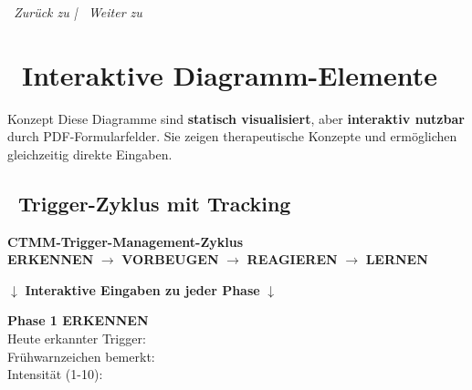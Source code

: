 \begin{center}
\textit{\textcolor{ctmmBlue}{\faChevronRight~Zurück zu}  | \textcolor{ctmmGreen}{\faChevronRight~Weiter zu} }
\end{center}

\section*{\textcolor{ctmmBlue}{\faChartBar~Interaktive Diagramm-Elemente}}
\label{sec:interactive-diagrams}

\begin{ctmmBlueBox}{Konzept}
Diese Diagramme sind \textbf{statisch visualisiert}, aber \textbf{interaktiv nutzbar} durch PDF-Formularfelder. Sie zeigen therapeutische Konzepte und ermöglichen gleichzeitig direkte Eingaben.
\end{ctmmBlueBox}

\subsection*{\faSync~Trigger-Zyklus mit Tracking}


\begin{tcolorbox}[colback=white,colframe=ctmmBlue,width=14cm]
\centering
\textbf{CTMM-Trigger-Management-Zyklus}\\[0.5cm]

\textcolor{ctmmBlue}{\Large\faEye} \textbf{ERKENNEN} 
$\rightarrow$ 
\textcolor{ctmmGreen}{\Large\faLock} \textbf{VORBEUGEN} 
$\rightarrow$ 
\textcolor{ctmmOrange}{\Large\faExclamationTriangle} \textbf{REAGIEREN} 
$\rightarrow$ 
\textcolor{ctmmPurple}{\Large\faBrain} \textbf{LERNEN}\\[0.3cm]

\begin{small}
$\downarrow$ \textbf{Interaktive Eingaben zu jeder Phase} $\downarrow$
\end{small}
\end{tcolorbox}

\begin{ctmmGreenBox}{}
\textbf{Phase 1 ERKENNEN}\\
Heute erkannter Trigger: \\[0.2cm]
Frühwarnzeichen bemerkt:   \\[0.2cm]
Intensität (1-10): 
\end{ctmmGreenBox}

